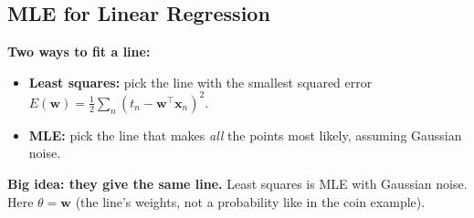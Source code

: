 \subsection*{MLE for Linear Regression}
\textbf{Two ways to fit a line:}

\begin{itemize}
    \item \textbf{Least squares:} pick the line with the smallest squared error $E(\mathbf{w}) = \frac{1}{2}\sum_n (t_n - \mathbf{w}^\top\mathbf{x}_n)^2$.
  \item \textbf{MLE:} pick the line that makes \emph{all} the points most likely, assuming Gaussian noise.
\end{itemize}

\textbf{Big idea: they give the same line.} Least squares is MLE with Gaussian noise. Here $\theta = \mathbf{w}$ (the line's weights, not a probability like in the coin example).

